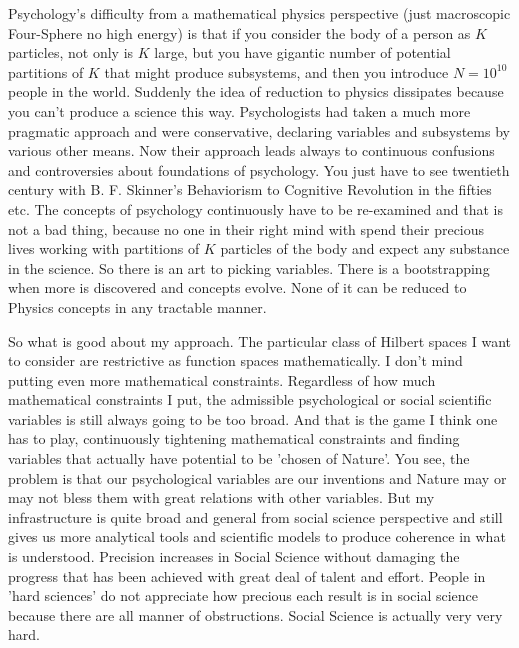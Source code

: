 \documentclass{amsart}
\begin{document}
Psychology's difficulty from a mathematical physics perspective (just macroscopic Four-Sphere no high energy) is that if you consider the body of a person as $K$ particles, not only is $K$ large, but you have gigantic number of potential partitions of $K$ that might produce subsystems, and then you introduce $N=10^{10}$ people in the world.  Suddenly the idea of reduction to physics dissipates because you can't produce a science this way.  Psychologists had taken a much more pragmatic approach and were conservative, declaring variables and subsystems by various other means.  Now their approach leads always to continuous confusions and controversies about foundations of psychology.  You just have to see twentieth century with B. F. Skinner's Behaviorism to Cognitive Revolution in the fifties etc.  The concepts of psychology continuously have to be re-examined and that is not a bad thing, because no one in their right mind with spend their precious lives working with partitions of $K$ particles of the body and expect any substance in the science.  So there is an art to picking variables.  There is a bootstrapping when more is discovered and concepts evolve.  None of it can be reduced to Physics concepts in any tractable manner.  

So what is good about my approach.  The particular class of Hilbert spaces I want to consider are restrictive as function spaces mathematically.  I don't mind putting even more mathematical constraints.  Regardless of how much mathematical constraints I put, the admissible psychological or social scientific variables is still always going to be too broad.  And that is the game I think one has to play, continuously tightening mathematical constraints and finding variables that actually have potential to be 'chosen of Nature'.  You see, the problem is that our psychological variables are our inventions and Nature may or may not bless them with great relations with other variables.  But my infrastructure is quite broad and general from social science perspective and still gives us more analytical tools and scientific models to produce coherence in what is understood.  Precision increases in Social Science without damaging the progress that has been achieved with great deal of talent and effort.  People in 'hard sciences' do not appreciate how precious each result is in social science because there are all manner of obstructions.  Social Science is actually very very hard.
\end{document}
